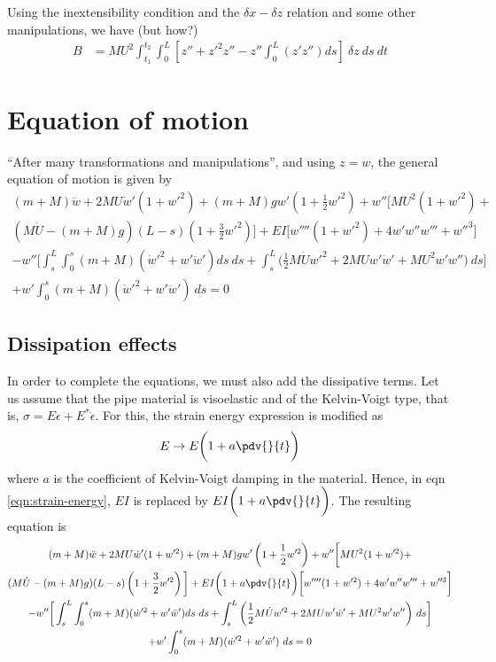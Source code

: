 Using the inextensibility condition and the $\delta x-\delta z$ relation and some other manipulations, we have (but how?)
\begin{align*}
  B &= MU^2 \int_{t_1}^{t_2}\int_0^L [z'' + {z'}^2z'' - z''\int_0^L (z'z'')ds]~\delta z~ds~dt
\end{align*}

\section{Equation of motion}
``After many transformations and manipulations'', and using $z = w$, the general equation of motion is given by
\begin{multline}
(m + M) \ddot{w} + 2MU \dot{w}'(1 + w'^2) + (m + M)gw'\left(1 + \frac{1}{2}w'^2\right) + w''\bigg[MU^2(1 + w'^2) + \\(M\dot{U} - (m + M)g)(L - s)\left(1 + \frac{3}{2}w'^2\right)\bigg] + EI \bigg[w''''(1 + w'^2) + 4w'w''w''' + w''^3\bigg] \\
- w'' \bigg[\int_s^L \int_0^s (m + M)(\dot{w}'^2 + w'\ddot{w}')ds~ds + \int_s^L \bigg(\frac{1}{2}M\dot{U}w'^2 + 2MUw'\dot{w}' + MU^2w'w''\bigg)~ds\bigg] \\
+ w'\int_0^s (m + M)(\dot{w}'^2 +w'\ddot{w}')~ds = 0 \label{eqn:cantilevered-pipe}
\end{multline}

\subsection{Dissipation effects}
In order to complete the equations, we must also add the dissipative terms. Let us assume that the pipe material is visoelastic and of the Kelvin-Voigt type, that is, $\sigma = E\epsilon + E^* \dot{\epsilon}$. For this, the strain energy expression is modified as 
\begin{align}
   E \rightarrow E\bigg(1 + a\pdv{}{t}\bigg) \label{eqn:dissipation-effect}
\end{align} 
where $a$ is the coefficient of Kelvin-Voigt damping in the material. Hence, in eqn \ref{eqn:strain-energy}, $EI$ is replaced by $EI\bigg(1 + a\pdv{}{t}\bigg)$. 
The resulting equation is
\begin{multline}
(m + M) \ddot{w} + 2MU \dot{w}'(1 + w'^2) + (m + M)gw'\left(1 + \frac{1}{2}w'^2\right) + w''\bigg[MU^2(1 + w'^2) + \\(M\dot{U} - (m + M)g)(L - s)\left(1 + \frac{3}{2}w'^2\right)\bigg] + EI\bigg(1 + a\pdv{}{t}\bigg) \bigg[w''''(1 + w'^2) + 4w'w''w''' + w''^3\bigg] \\
- w'' \bigg[\int_s^L \int_0^s (m + M)(\dot{w}'^2 + w'\ddot{w}')ds~ds + \int_s^L \bigg(\frac{1}{2}M\dot{U}w'^2 + 2MUw'\dot{w}' + MU^2w'w''\bigg)~ds\bigg] \\
+ w'\int_0^s (m + M)(\dot{w}'^2 +w'\ddot{w}')~ds = 0 \label{eqn:cantilevered-pipe-dissipation}
\end{multline}


